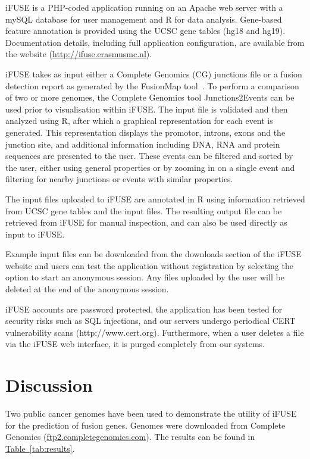 iFUSE is a PHP-coded application running on an Apache web server with a mySQL database for user management and R for data analysis. Gene-based feature annotation is provided using the UCSC gene tables (hg18 and hg19). Documentation details, including full application configuration, are available from the website (\href{http://ifuse.erasmusmc.nl}{http://ifuse.erasmusmc.nl}).

iFUSE takes as input either a Complete Genomics (CG) junctions file or a fusion detection report as generated by the FusionMap tool~\cite{ge2011fusionmap}.  To perform a comparison of two or more genomes, the Complete Genomics tool Junctions2Events can be used prior to visualisation within iFUSE\@. \color{black}
The input file is validated and then analyzed using R, after which a graphical representation for each event is generated. This representation displays the promotor, introns, exons and the junction site, and additional information including DNA, RNA and protein sequences are presented to the user. These events can be filtered and sorted by the user, either using general properties or by zooming in on a single event and filtering for nearby junctions or events with similar properties.

The input files uploaded to iFUSE are annotated in R using information retrieved from UCSC gene tables and the input files. The resulting output file can be retrieved from iFUSE for manual inspection, and can also be used directly as input to iFUSE.

Example input files can be downloaded from the downloads section of the iFUSE website and users can test the application without registration by selecting the option to start an anonymous session. Any files uploaded by the user will be deleted at the end of the anonymous session.\

iFUSE accounts are password protected, the application has been tested for security risks such as SQL injections, and our servers undergo periodical CERT vulnerability scans (http://www.cert.org). Furthermore, when a user deletes a file via the iFUSE web interface, it is purged completely from our systems.

\section*{Discussion}


Two public cancer genomes have been used to demonstrate the utility of iFUSE for the prediction of fusion genes. Genomes were downloaded from Complete Genomics (\href{ftp2.completegenomics.com}{ftp2.completegenomics.com}). The results can be found in \hyperref[tab:results]{Table~\ref*{tab:results}}.


